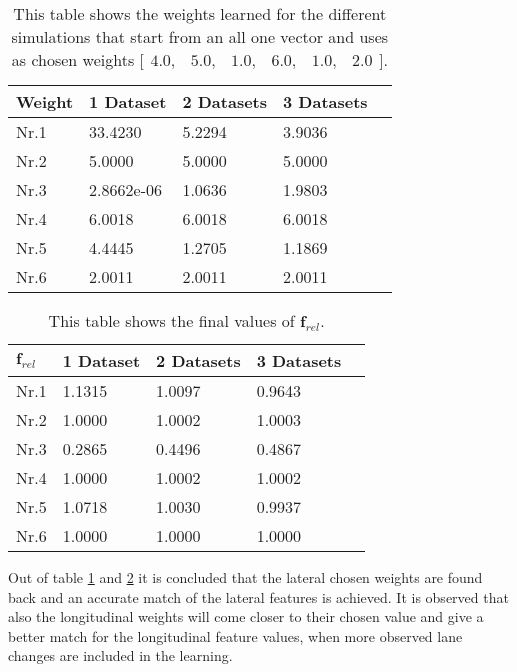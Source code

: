 \begin{table}[h!]
	\centering
	\begin{tabular}{@{}llllr@{}} \toprule
		\textbf{Weight}   & 1 Dataset    & 2 Datasets     & 3 Datasets\\ \midrule
		Nr.1       		  &33.4230       & 5.2294       & 3.9036		\\
		Nr.2              & 5.0000         & 5.0000          & 5.0000       \\
		Nr.3              & 2.8662e-06     & 1.0636      & 1.9803      \\
		Nr.4              & 6.0018           & 6.0018            &   6.0018     \\
		Nr.5              & 4.4445     & 1.2705      & 1.1869       \\
		Nr.6              & 2.0011        & 2.0011         & 2.0011      \\ \bottomrule
	\end{tabular}
	\caption{This table shows the weights learned for the different simulations that start from an all one vector and uses as chosen weights $\bigl[ \begin{smallmatrix} 4.0,&5.0,&1.0,&6.0,&1.0,&2.0\end{smallmatrix}\bigr]$.}
	\label{tab:complex_learning_weights}
\end{table}

\begin{table}[h!]
	\centering
	\begin{tabular}{@{}llllr@{}} \toprule
		$\bm{f}_{rel}$   & 1 Dataset    & 2 Datasets     & 3 Datasets\\ \midrule
		Nr.1       		  &1.1315        & 1.0097       & 0.9643		\\
		Nr.2              & 1.0000         & 1.0002     & 1.0003       \\
		Nr.3              & 0.2865     & 0.4496     	& 0.4867      \\
		Nr.4              & 1.0000           & 1.0002   &   1.0002     \\
		Nr.5              & 1.0718     & 1.0030         & 0.9937       \\
		Nr.6              & 1.0000        & 1.0000      & 1.0000     \\ \bottomrule
	\end{tabular}
	\caption{This table shows the final values of $\bm{f}_{rel}$.}
	\label{tab:complex_frel}
\end{table}

Out of table \ref{tab:complex_learning_weights} and \ref{tab:complex_frel} it is concluded that the lateral chosen weights are found back and an accurate match of the lateral features is achieved. It is observed that also the longitudinal weights will come closer to their chosen value and give a better match for the longitudinal feature values, when more observed lane changes are included in the learning.\\

